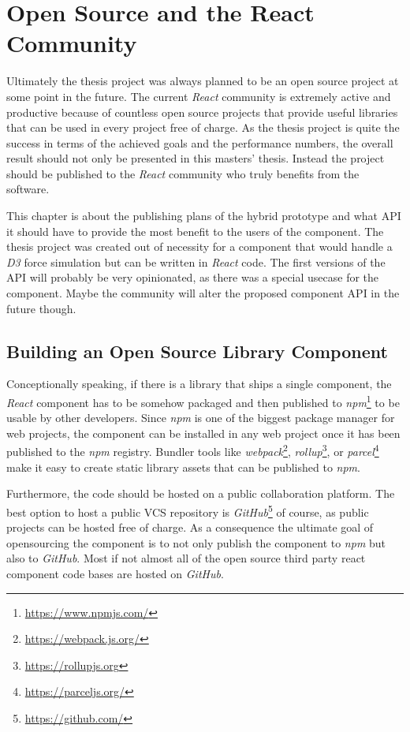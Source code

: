 \chapter{Open Source and the React Community}
\label{cha:opensource}

Ultimately the thesis project was always planned to be an open source project at some point in the future. The current \emph{React} community is extremely active and productive because of countless open source projects that provide useful libraries that can be used in every project free of charge. As the thesis project is quite the success in terms of the achieved goals and the performance numbers, the overall result should not only be presented in this masters' thesis. Instead the project should be published to the \emph{React} community who truly benefits from the software.

This chapter is about the publishing plans of the hybrid prototype and what API it should have to provide the most benefit to the users of the component. The thesis project was created out of necessity for a component that would handle a \emph{D3} force simulation but can be written in \emph{React} code. The first versions of the API will probably be very opinionated, as there was a special usecase for the component. Maybe the community will alter the proposed component API in the future though.

\section{Building an Open Source Library Component}

Conceptionally speaking, if there is a library that ships a single component, the \emph{React} component has to be somehow packaged and then published to \emph{npm}\footnote{\url{https://www.npmjs.com/}} to be usable by other developers. Since \emph{npm} is one of the biggest package manager for web projects, the component can be installed in any web project once it has been published to the \emph{npm} registry. Bundler tools like \emph{webpack}\footnote{\url{https://webpack.js.org/}}, \emph{rollup}\footnote{\url{https://rollupjs.org}}, or \emph{parcel}\footnote{\url{https://parceljs.org/}} make it easy to create static library assets that can be published to \emph{npm}.

Furthermore, the code should be hosted on a public collaboration platform. The best option to host a public VCS repository is \emph{GitHub}\footnote{\url{https://github.com/}} of course, as public projects can be hosted free of charge. As a consequence the ultimate goal of opensourcing the component is to not only publish the component to \emph{npm} but also to \emph{GitHub}. Most if not almost all of the open source third party react component code bases are hosted on \emph{GitHub}.

